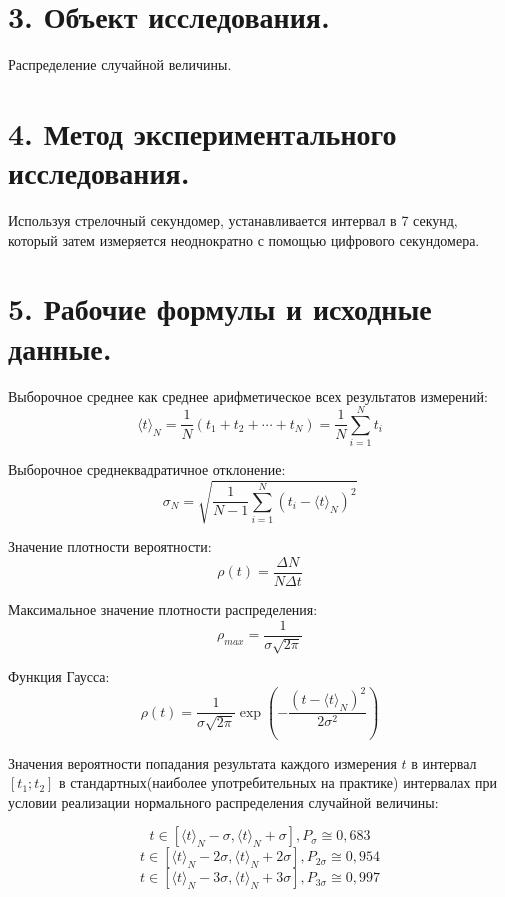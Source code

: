 \documentclass[14pt]{extreport}
\begin{document}
\section*{3. Объект исследования.}
Распределение случайной величины.

\section*{4. Метод экспериментального исследования.}
Используя стрелочный секундомер, устанавливается интервал в 7 секунд, который затем измеряется неоднократно с помощью цифрового секундомера.

\section*{5. Рабочие формулы и исходные данные.}
Выборочное среднее как среднее арифметическое всех результатов измерений:
\begin{equation}\label{f1}
    \langle t \rangle_N = \frac{1}{N}(t_1+t_2+\dotsb+t_N)=\frac{1}{N}\displaystyle\sum_{i=1}^{N} t_i
\end{equation}

Выборочное среднеквадратичное отклонение:
\begin{equation}\label{f3}
    \sigma_N = \sqrt{\frac{1}{N-1}\displaystyle\sum_{i=1}^{N} (t_i - \langle t \rangle_N)^2}
\end{equation}

Значение плотности вероятности:
\begin{equation}\label{f2}
    \rho(t) = \frac{\Delta N}{N \Delta t}
\end{equation}

Максимальное значение плотности распределения:
\begin{equation}\label{f4}
    \rho_{max} = \frac{1}{\sigma\sqrt{2\pi}}
\end{equation}

Функция Гаусса:
\begin{equation}\label{f5}
    \rho(t) = \frac{1}{\sigma\sqrt{2\pi}}\exp{\left(-\frac{(t - \langle t \rangle_N)^2}{2\sigma^2}\right)}
\end{equation}
\newpage

Значения вероятности попадания результата каждого измерения $t$ в интервал $[t_1; t_2]$ в стандартных(наиболее употребительных на практике) интервалах при условии реализации нормального распределения случайной величины:


\begin{equation*}\label{f6}
    t \in [\langle t \rangle_N - \sigma, \langle t \rangle_N + \sigma], P_{\sigma} \cong 0,683
\end{equation*}
\begin{equation}\label{f7}
    t \in [\langle t \rangle_N - 2\sigma, \langle t \rangle_N + 2\sigma], P_{2\sigma} \cong 0,954
\end{equation}
\begin{equation*}\label{f8}
    t \in [\langle t \rangle_N - 3\sigma, \langle t \rangle_N + 3\sigma], P_{3\sigma} \cong 0,997
\end{equation*}
\end{document}
